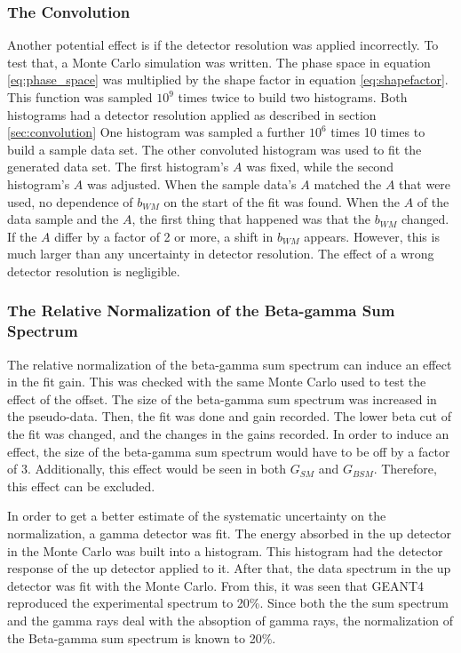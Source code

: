 \documentclass[../MaxHughesThesis.tex]{subfiles}
\begin{document}
\subsubsection{The Convolution}

Another potential effect is if the detector resolution was applied incorrectly.
To test that, a Monte Carlo simulation was written.
The phase space in equation \ref{eq:phase_space} was multiplied by the shape factor in equation \ref{eq:shapefactor}.
This function was sampled $10^{9}$ times twice to build two histograms. 
Both histograms had a detector resolution applied as described in section \ref{sec:convolution}
One histogram was sampled a further $10^{6}$ times 10 times to build a sample data set.
The other convoluted histogram was used to fit the generated data set.
The first histogram's $A$ was fixed, while the second histogram's $A$ was adjusted.
When the sample data's $A$ matched the $A$ that were used, no dependence of $b_{WM}$ on the start of the fit was found.
When the $A$ of the data sample and the $A$, the first thing that happened was that the $b_{WM}$ changed.
If the $A$ differ by a factor of 2 or more, a shift in $b_{WM}$ appears.
However, this is much larger than any uncertainty in detector resolution.
The effect of a wrong detector resolution is negligible. 

\subsubsection{The Relative Normalization of the Beta-gamma Sum Spectrum}

The relative normalization of the beta-gamma sum spectrum can induce an effect in the fit gain.
This was checked with the same Monte Carlo used to test the effect of the offset.
The size of the beta-gamma sum spectrum was increased in the pseudo-data.
Then, the fit was done and gain recorded.
The lower beta cut of the fit was changed, and the changes in the gains recorded.
In order to induce an effect, the size of the beta-gamma sum spectrum would have to be off by a factor of 3.
Additionally, this effect would be seen in both $G_{SM}$ and $G_{BSM}$. 
Therefore, this effect can be excluded.

In order to get a better estimate of the systematic uncertainty on the normalization, a gamma detector was fit.
The energy absorbed in the up detector in the Monte Carlo was built into a histogram.
This histogram had the detector response of the up detector applied to it.
After that, the data spectrum in the up detector was fit with the Monte Carlo.
From this, it was seen that GEANT4 reproduced the experimental spectrum to 20\%.
Since both the the sum spectrum and the gamma rays deal with the absoption of gamma rays, the normalization of the Beta-gamma sum spectrum is known to 20\%.    
\end{document}

